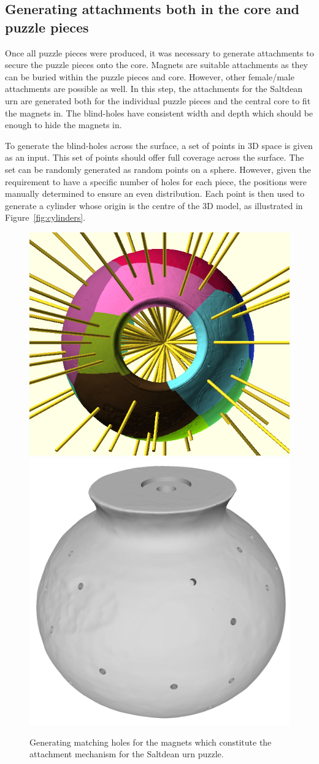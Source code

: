 \documentclass[acmlarge,screen,dvipsnames]{acmart}
\begin{document}
\subsection{Generating attachments both in the core and puzzle pieces}

Once all puzzle pieces were produced, it was necessary to generate
attachments to secure the puzzle pieces onto the core. Magnets are
suitable attachments as they can be buried within the puzzle pieces
and core. However, other female/male attachments are possible as
well. In this step, the attachments for the Saltdean urn are generated
both for the individual puzzle pieces and the central core to fit the
magnets in. The blind-holes have consistent width and depth which
should be enough to hide the magnets in.

To generate the blind-holes across the surface, a set of points in 3D
space is given as an input. This set of points should offer full
coverage across the surface. The set can be randomly generated as
random points on a sphere. However, given the requirement to have a
specific number of holes for each piece, the positions were manually
determined to ensure an even distribution. Each point is then used to
generate a cylinder whose origin is the centre of the 3D model, as
illustrated in Figure~\ref{fig:cylinders}.
%
\begin{figure}[htb]
  \centering
  {\includegraphics[width=0.45\linewidth]{images/allcylinders.jpg}}
  {\includegraphics[width=0.45\linewidth]{images/coreholes}}
 \caption{Generating matching holes for the magnets which constitute the attachment mechanism for the Saltdean urn puzzle.}
\end{figure}
\end{document}
